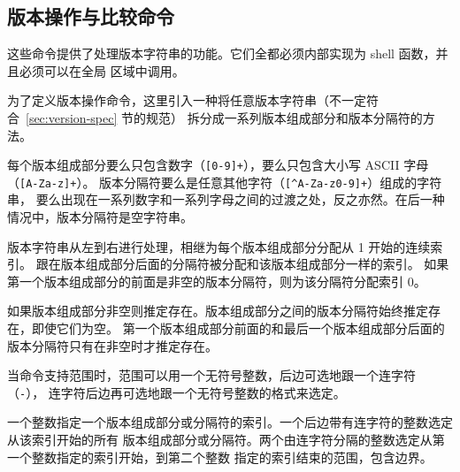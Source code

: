 \subsection{版本操作与比较命令}
这些命令提供了处理版本字符串的功能。它们全都必须内部实现为 shell 函数，并且必须可以在全局
区域中调用。

为了定义版本操作命令，这里引入一种将任意版本字符串（不一定符合~\ref{sec:version-spec} 节的规范）
拆分成一系列版本组成部分和版本分隔符的方法。

每个版本组成部分要么只包含数字（\texttt{[0-9]+}）\hspace{0em}，要么只包含大小写 ASCII 字母（\texttt{[A-Za-z]+}）。
版本分隔符要么是任意其他字符（\texttt{[\textasciicircum A-Za-z0-9]+}）组成的字符串，
要么出现在一系列数字和一系列字母之间的过渡之处，反之亦然。在后一种情况中，版本分隔符是空字符串。

版本字符串从左到右进行处理，相继为每个版本组成部分分配从 1 开始的连续索引。
跟在版本组成部分后面的分隔符被分配和该版本组成部分一样的索引。
如果第一个版本组成部分的前面是非空的版本分隔符，则为该分隔符分配索引 0。

如果版本组成部分非空则推定存在。版本组成部分之间的版本分隔符始终推定存在，即使它们为空。
第一个版本组成部分前面的和最后一个版本组成部分后面的版本分隔符只有在非空时才推定存在。

当命令支持范围时，范围可以用一个无符号整数，后边可选地跟一个连字符（\texttt{-}），
连字符后边再可选地跟一个无符号整数的格式来选定。

一个整数指定一个版本组成部分或分隔符的索引。一个后边带有连字符的整数选定从该索引开始的所有
版本组成部分或分隔符。两个由连字符分隔的整数选定从第一个整数指定的索引开始，到第二个整数
指定的索引结束的范围，包含边界。

